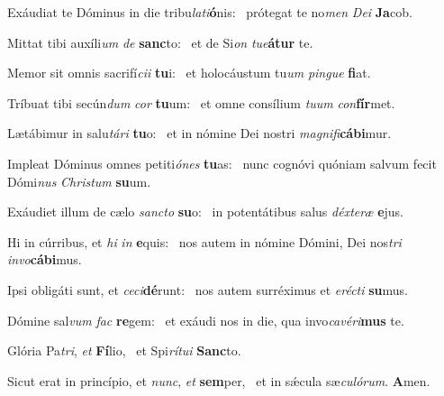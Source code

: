 \item Exáudiat te Dóminus in die tribu\textit{lati}\textbf{ó}nis:~\psstar{} prótegat te no\textit{men} \textit{Dei} \textbf{Ja}cob.
\item Mittat tibi auxíli\textit{um} \textit{de} \textbf{sanc}to:~\psstar{} et de Si\textit{on} \textit{tue}\textbf{á}\textbf{tur} te.
\item Memor sit omnis sacrifí\textit{cii} \textbf{tu}i:~\psstar{} et holocáustum tu\textit{um} \textit{pingue} \textbf{fi}at.
\item Tríbuat tibi secún\textit{dum} \textit{cor} \textbf{tu}um:~\psstar{} et omne consílium \textit{tuum} \textit{con}\textbf{fír}met.
\item Lætábimur in salu\textit{tári} \textbf{tu}o:~\psstar{} et in nómine Dei nostri \textit{magnifi}\textbf{cá}\textbf{bi}mur.
\item Impleat Dóminus omnes petiti\textit{ónes} \textbf{tu}as:~\psstar{} nunc cognóvi quóniam salvum fecit Dómi\textit{nus} \textit{Christum} \textbf{su}um.
\item Exáudiet illum de cælo \textit{sancto} \textbf{su}o:~\psstar{} in potentátibus salus \textit{déxteræ} \textbf{e}jus.
\item Hi in cúrribus, et \textit{hi} \textit{in} \textbf{e}quis:~\psstar{} nos autem in nómine Dómini, Dei nos\textit{tri} \textit{invo}\textbf{cá}\textbf{bi}mus.
\item Ipsi obligáti sunt, et \textit{ceci}\textbf{dé}runt:~\psstar{} nos autem surréximus et \textit{erécti} \textbf{su}mus.
\item Dómine sal\textit{vum} \textit{fac} \textbf{re}gem:~\psstar{} et exáudi nos in die, qua invo\textit{cavéri}\textbf{mus} te.
\item Glória Pa\textit{tri}, \textit{et} \textbf{Fí}lio,~\psstar{} et Spi\textit{rítui} \textbf{Sanc}to.
\item Sicut erat in princípio, et \textit{nunc}, \textit{et} \textbf{sem}per,~\psstar{} et in sǽcula sæ\textit{culórum}. \textbf{A}men.
